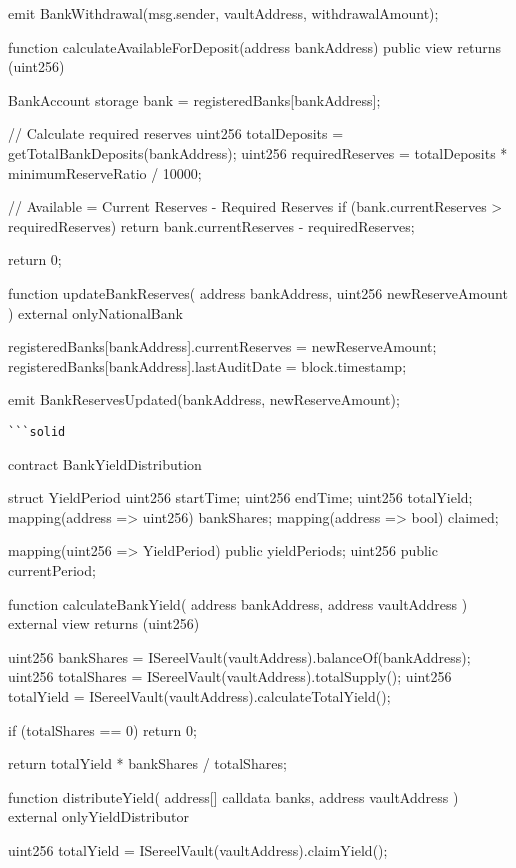 \documentclass[12pt]{article}
\begin{document}
{{{        emit BankWithdrawal(msg.sender, vaultAddress, withdrawalAmount);    }

    function calculateAvailableForDeposit(address bankAddress) public view returns (uint256) {        BankAccount storage bank = registeredBanks[bankAddress];

        // Calculate required reserves        uint256 totalDeposits = getTotalBankDeposits(bankAddress);        uint256 requiredReserves = totalDeposits * minimumReserveRatio / 10000;

        // Available = Current Reserves - Required Reserves        if (bank.currentReserves > requiredReserves) {            return bank.currentReserves - requiredReserves;        }

        return 0;    }

    function updateBankReserves(        address bankAddress,        uint256 newReserveAmount    ) external onlyNationalBank {        registeredBanks[bankAddress].currentReserves = newReserveAmount;        registeredBanks[bankAddress].lastAuditDate = block.timestamp;

        emit BankReservesUpdated(bankAddress, newReserveAmount);    }}

\begin{lstlisting}
```solid
\end{lstlisting}
contract BankYieldDistribution {    struct YieldPeriod {        uint256 startTime;        uint256 endTime;        uint256 totalYield;        mapping(address => uint256) bankShares;        mapping(address => bool) claimed;    }

    mapping(uint256 => YieldPeriod) public yieldPeriods;    uint256 public currentPeriod;

    function calculateBankYield(        address bankAddress,        address vaultAddress    ) external view returns (uint256) {        uint256 bankShares = ISereelVault(vaultAddress).balanceOf(bankAddress);        uint256 totalShares = ISereelVault(vaultAddress).totalSupply();        uint256 totalYield = ISereelVault(vaultAddress).calculateTotalYield();

        if (totalShares == 0) return 0;

        return totalYield * bankShares / totalShares;    }

    function distributeYield(        address[] calldata banks,        address vaultAddress    ) external onlyYieldDistributor {        uint256 totalYield = ISereelVault(vaultAddress).claimYield();

}}}
\end{document}
